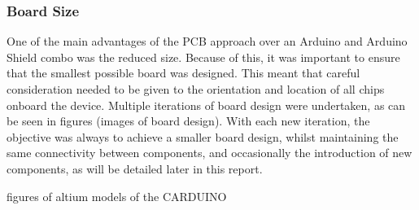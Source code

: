 \subsubsection{Board Size}
One of the main advantages of the PCB approach over an Arduino and Arduino Shield combo was the reduced size. Because of this, it was important to ensure that the smallest possible board was designed. This meant that careful consideration needed to be given to the orientation and location
of all chips onboard the device. Multiple iterations of board design were undertaken, as can be seen in figures (images of board design). With each new iteration, the objective was always to achieve a smaller board design, whilst maintaining the same connectivity between components, and occasionally the introduction of new components, as will be detailed later in this report.

figures of altium models of the CARDUINO

